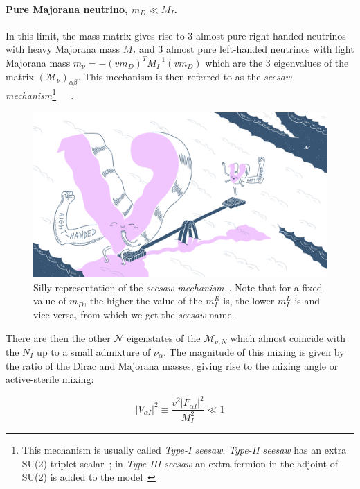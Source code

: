 \paragraph {Pure Majorana neutrino, $m_D \ll M_I$.}
In this limit, the mass matrix gives rise to 3 almost pure right-handed neutrinos with heavy Majorana mass $M_I$ and 3 almost pure left-handed neutrinos with light Majorana mass $m_\nu = - (vm_D)^{T}M^{-1}_{I}(vm_D)$ which are the 3 eigenvalues of the matrix $(\mathcal{M}_{\nu})_{\alpha \beta}$. This mechanism is then referred to as the \emph{seesaw mechanism}\footnote{This mechanism is usually called \emph{Type-I seesaw}. \emph{Type-II seesaw} has an extra SU(2) triplet scalar~\cite{Deppisch_2015}; in \emph{Type-III seesaw} an extra fermion in the adjoint of SU(2) is added to the model~\cite{Foot:1988aq}}~\cite{MINKOWSKI1977421}~\cite{Mohapatra:1979ia}~\cite{Yanagida:1979as}.
\begin{figure}[h!]
  \centering
  \includegraphics[width=.60\textwidth]{Figures/c3/funny.png}
    \caption{Silly representation of the \emph{seesaw mechanism}~\cite{funny}. Note that for a fixed value of $m_D$, the higher the value of the $m^{R}_I$ is, the lower $m^{L}_I$ is and vice-versa, from which we get the \emph{seesaw} name.}
  \label{fig:c3funny}
\end{figure}
There are then the other $\mathcal{N}$ eigenstates of the $\mathcal{M}_{\nu,N}$ which almost coincide with the $N_I$ up to a small admixture of $\nu_\alpha$.
The magnitude of this mixing is given by the ratio of the Dirac and Majorana masses, giving rise to the mixing angle or active-sterile mixing:

\begin{equation}
\label{eq:v2}
 |V_{\alpha I} |^{2}\equiv \frac{v^{2}|F_{\alpha I}|^2}{M^{2}_{I}} \ll 1
\end{equation}

